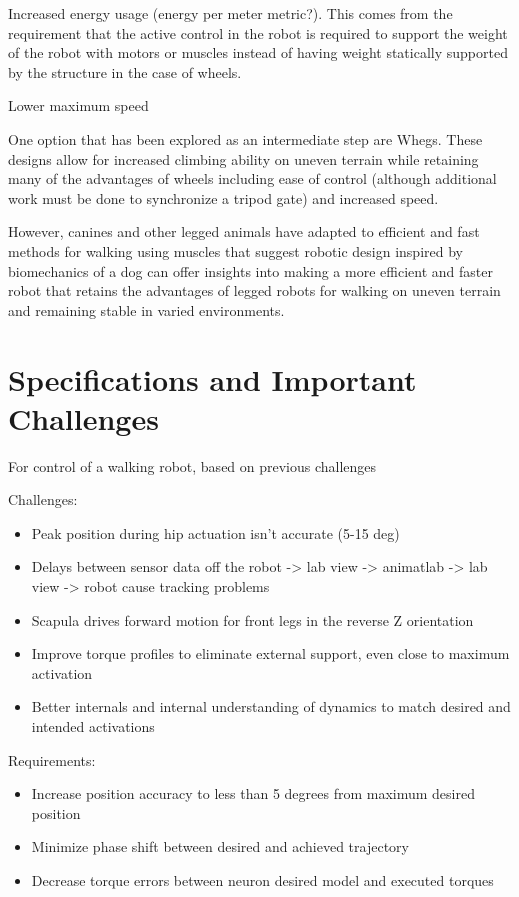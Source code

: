 Increased energy usage (energy per meter metric?). This comes from the
requirement that the active control in the robot is required to support the
weight of the robot with motors or muscles instead of having weight statically
supported by the structure in the case of wheels.

Lower maximum speed


One option that has been explored as an intermediate step are Whegs. These
designs allow for increased climbing ability on uneven terrain while retaining
many of the advantages of wheels including ease of control (although additional
work must be done to synchronize a tripod gate) and increased speed.


However, canines and other legged animals have adapted to efficient and fast 
methods for walking using muscles that suggest robotic design inspired by 
biomechanics of a dog can offer insights into making a more efficient and 
faster robot that retains the advantages of legged robots for walking on uneven
terrain and remaining stable in varied environments.

\section{Specifications and Important Challenges}

For control of a walking robot, based on previous challenges

Challenges:
\begin{itemize}
\item Peak position during hip actuation isn't accurate (5-15 deg) 
\item Delays between sensor data off the robot -> lab view -> animatlab -> lab
view -> robot cause tracking problems
\item Scapula drives forward motion for front legs in the reverse Z orientation
\item Improve torque profiles to eliminate external support, even close to
maximum activation
\item Better internals and internal understanding of dynamics to match desired
and intended activations
\end{itemize}

Requirements:
\begin{itemize}
\item Increase position accuracy to less than 5 degrees from maximum desired position
\item Minimize phase shift between desired and achieved trajectory
\item Decrease torque errors between neuron desired model and executed torques
\end{itemize}

